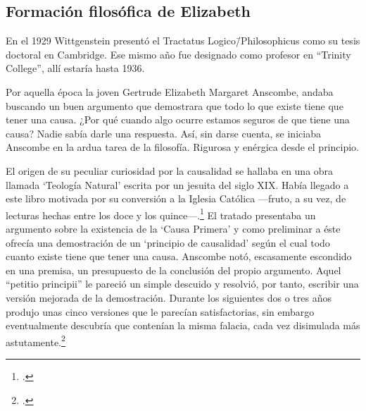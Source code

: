 \subsection{Formación filosófica de Elizabeth}

En el 1929 Wittgenstein presentó el Tractatus Logico\=/Philosophicus como su
tesis doctoral en Cambridge. Ese mismo año fue designado como profesor en
``Trinity College'', allí estaría hasta 1936.

Por aquella época la joven Gertrude Elizabeth Margaret Anscombe, andaba buscando
un buen argumento que demostrara que todo lo que existe tiene que tener una
causa. ¿Por qué cuando algo ocurre estamos seguros de que tiene una causa? Nadie
sabía darle una respuesta. Así, sin darse cuenta, se iniciaba Anscombe en la
ardua tarea de la filosofía. Rigurosa y enérgica desde el principio.

El origen de su peculiar curiosidad por la causalidad se hallaba en una obra
llamada `Teología Natural' escrita por un jesuita del siglo XIX. Había llegado a
este libro motivada por su conversión a la Iglesia Católica ---fruto, a su vez,
de lecturas hechas entre los doce y los quince---.\footcite[cf.~][p.~vii
\S1]{M&PotM} El tratado presentaba un argumento sobre la existencia de la `Causa
Primera' y como preliminar a éste ofrecía una demostración de un `principio de
causalidad' según el cual todo cuanto existe tiene que tener una causa. Anscombe
notó, escasamente escondido en una premisa, un presupuesto de la conclusión del
propio argumento. Aquel ``petitio principii'' le pareció un simple descuido y
resolvió, por tanto, escribir una versión mejorada de la demostración. Durante
los siguientes dos o tres años produjo unas cinco versiones que le parecían
satisfactorias, sin embargo eventualmente descubría que contenían la misma
falacia, cada vez disimulada más astutamente.\footcite[cf.~][p.~vii \S2]{M&PotM}

